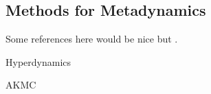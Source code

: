 %

\subsection{Methods for Metadynamics}
\bit
\item Some references here would be nice but .
\item Hyperdynamics
\item AKMC
\eit
\placeholder

